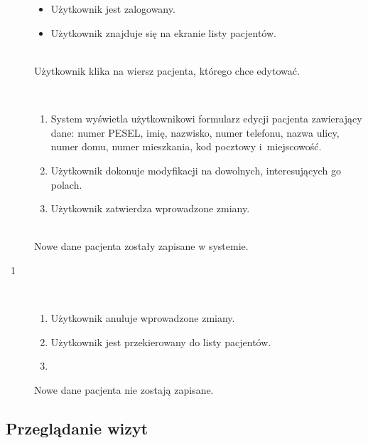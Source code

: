 \documentclass[11pt]{aghdpl}
\begin{document}
	\begin{description}
		\item[\useCaseAktor] \hfill \\
			\useCaseUzytkownik
		\item[\useCaseWarPocz] \hfill \\
			\begin{itemize}
				\item Użytkownik jest zalogowany.
				\item Użytkownik znajduje się na ekranie listy pacjentów.
			\end{itemize}
		\item[\useCaseZdarzInicj] \hfill \\
			Użytkownik klika na wiersz pacjenta, którego chce edytować.
		\item[\useCaseScenBaz] \hfill \\ 
			\begin{enumerate}
				\item System wyświetla użytkownikowi formularz edycji pacjenta zawierający dane: numer PESEL, imię, nazwisko, numer telefonu, nazwa ulicy, numer domu, numer mieszkania, kod pocztowy i~miejscowość.
				\item Użytkownik dokonuje modyfikacji na dowolnych, interesujących go polach.
				\item Użytkownik zatwierdza wprowadzone zmiany.
			\end{enumerate}
		\item[\useCaseWarKonc] \hfill \\ 
			Nowe dane pacjenta zostały zapisane w systemie.
		\item[\useCaseWyjatek~1] \hfill \\
			\begin{enumerate}[label=3a\arabic*.]
				\item Użytkownik anuluje wprowadzone zmiany.
				\item Użytkownik jest przekierowany do listy pacjentów.
				\item \useCaseEnd
			\end{enumerate}
			Nowe dane pacjenta nie zostają zapisane.
	\end{description}

\subsection{Przeglądanie wizyt}
	
\end{document}
